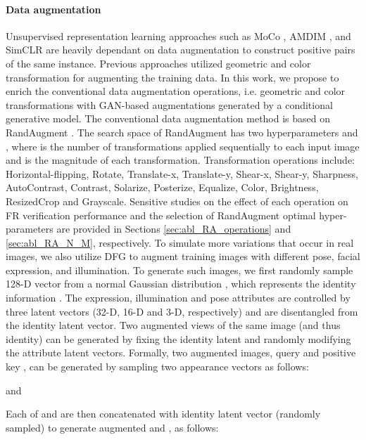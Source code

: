 \documentclass[10pt,twocolumn,letterpaper]{ieeeconf}
\begin{document}
\paragraph{Data augmentation}
\label{sec:data_augmentation}
Unsupervised representation learning approaches such as MoCo \cite{Moco}, AMDIM \cite{DBLP:conf/nips/BachmanHB19}, and SimCLR \cite{DBLP:conf/icml/ChenK0H20} are heavily dependant on data augmentation to construct positive pairs of the same instance. Previous approaches \cite{DBLP:conf/icml/ChenK0H20,DBLP:conf/nips/BachmanHB19,Moco} utilized geometric and color transformation for augmenting the training data. 
In this work, we propose to enrich the conventional data augmentation operations, i.e. geometric and color transformations with GAN-based augmentations generated by a conditional generative model.
The conventional data augmentation method is based on RandAugment \cite{Randaugment}. The search space of RandAugment has two hyperparameters  and , where  is the number of transformations applied sequentially to each input image and  is the magnitude of each transformation. 
Transformation operations include: Horizontal-flipping, Rotate, Translate-x, Translate-y, Shear-x, Shear-y, Sharpness, AutoContrast, Contrast, Solarize, Posterize, Equalize, Color, Brightness, ResizedCrop and Grayscale. Sensitive studies on the effect of each operation on FR verification performance and the selection of RandAugment optimal hyper-parameters are provided in Sections \ref{sec:abl_RA_operations} and \ref{sec:abl_RA_N_M}, respectively.
To simulate more variations that occur in real images, we also utilize DFG \cite{DiscoFaceGAN} to augment training images with different pose, facial expression, and illumination. 
To generate such images, we first randomly sample 128-D vector from a normal Gaussian distribution , which represents the identity information \cite{DiscoFaceGAN}. 
The expression, illumination and pose attributes are controlled by three latent vectors (32-D, 16-D and 3-D, respectively) and are disentangled from the identity latent vector. Two augmented views of the same image (and thus identity) can be generated by fixing the identity latent and randomly modifying the attribute latent vectors. Formally, two augmented images, query  and positive key , can be generated by sampling two appearance vectors as follows:

    and

Each of  and  are then concatenated with identity latent vector  (randomly sampled) to generate augmented  and , as follows:
\end{document}
